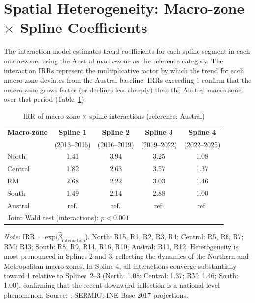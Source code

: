 \documentclass[pdflatex,sn-basic]{sn-jnl}
\newcommand{\tablenote}[1]{%
  \vspace{2pt}%
  {\par\footnotesize\textit{Note:} #1\par}%
}
\begin{document}
\clearpage
\section{Spatial Heterogeneity: Macro-zone \texorpdfstring{$\times$}{x} Spline Coefficients}
\label{ap:macro}

The interaction model estimates trend coefficients for each spline segment in each macro-zone, using the Austral macro-zone as the reference category. The interaction IRRs represent the multiplicative factor by which the trend for each macro-zone deviates from the Austral baseline: IRRs exceeding 1 confirm that the macro-zone grows faster (or declines less sharply) than the Austral macro-zone over that period (Table~\ref{tab:macro}).

\begin{table}[htbp]
\centering
\caption{IRR of macro-zone \texorpdfstring{$\times$}{x} spline interactions (reference: Austral)}
\label{tab:macro}
\small
\begin{tabular}{lcccc}
\toprule
\textbf{Macro-zone} & \textbf{Spline 1} & \textbf{Spline 2} & \textbf{Spline 3} & \textbf{Spline 4} \\
 & (2013--2016) & (2016--2019) & (2019--2022) & (2022--2025) \\
\midrule
North   & 1.41 & 3.94 & 3.25 & 1.08 \\
Central  & 1.82 & 2.63 & 3.57 & 1.37 \\
RM      & 2.68 & 2.22 & 3.03 & 1.46 \\
South     & 1.49 & 2.14 & 2.88 & 1.00 \\
Austral & ref. & ref. & ref. & ref. \\
\midrule
\multicolumn{5}{l}{Joint Wald test (interactions): $p < 0.001$} \\
\bottomrule
\end{tabular}
\tablenote{IRR = exp($\hat{\beta}_{\text{interaction}}$). North: R15, R1, R2, R3, R4; Central: R5, R6, R7; RM: R13; South: R8, R9, R14, R16, R10; Austral: R11, R12. Heterogeneity is most pronounced in Splines 2 and 3, reflecting the dynamics of the Northern and Metropolitan macro-zones. In Spline 4, all interactions converge substantially toward 1 relative to Splines~2--3 (North: 1.08; Central: 1.37; RM: 1.46; South: 1.00), confirming that the recent downward inflection is a national-level phenomenon. Source: \citet{INE2026}; SERMIG; INE Base 2017 projections.}
\end{table}

\end{document}
